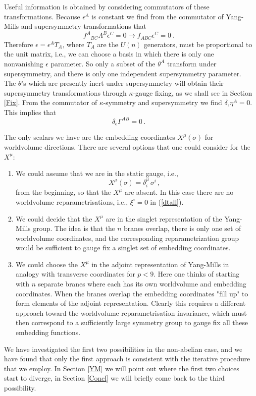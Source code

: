 \documentclass[12pt,a4paper]{article}
\begin{document}
Useful information is obtained by considering commutators of
these transformations.
Because $\epsilon^A$ is constant we find from the commutator of
Yang-Mills and supersymmetry transformations that
\begin{equation}
      f^{A}{}_{BC}\Lambda^B\epsilon^C=0\to f_{ABC}\epsilon^C=0\,.
\end{equation}
Therefore $\epsilon = \epsilon^A T_A$, where $T_A$ are the
$U(n)$ generators, must be proportional to the unit
matrix, i.e., we can choose a basis in which there is only
one nonvanishing $\epsilon$ parameter.
So only a subset of the $\theta^A$ transform under supersymmetry,
and there is only one independent supersymmetry parameter.
The $\theta$'s which are presently
inert under supersymmetry will obtain their supersymmetry
transformations through $\kappa$-gauge fixing, as we shall see
in Section \ref{Fix}. {From} the commutator of $\kappa$-symmetry and
supersymmetry we find $\delta_\epsilon \eta^A = 0$. This implies that
\begin{equation}
  \delta_\epsilon \Gamma^{AB} = 0\,.
\end{equation}

The only scalars we have are  the embedding coordinates
$X^\mu(\sigma)$ for worldvolume directions.
There are several options that one could consider for the $X^\mu$:
\begin{enumerate}
\item We could assume that we are in the static gauge, i.e.,
\begin{equation}
    X^\mu(\sigma) = \delta^\mu_i\,\sigma^i\,,
\end{equation}
 from the
 beginning, so that the $X^\mu$ are absent. In this case there are no
 worldvolume reparametrisations, i.e., $\xi^i=0$ in (\ref{dtall}).
\item We could decide that the $X^\mu$ are in the singlet representation
 of the Yang-Mills group. The idea is that the $n$ branes overlap,
 there is only one set of worldvolume coordinates, and the corresponding
 reparametrization group would be sufficient to gauge fix a singlet
 set of embedding coordinates.
\item We could choose the $X^\mu$ in the adjoint representation of
 Yang-Mills in analogy with transverse coordinates for $p<9$.
 Here one thinks of starting with $n$ separate branes where each has its
 own worldvolume and embedding coordinates. When the branes overlap
 the embedding coordinates "fill up" to form elements of the adjoint
 representation.
 Clearly
 this requires a different approach toward the worldvolume
 reparametrisation invariance, which must then correspond to a sufficiently
 large symmetry group to gauge fix all these embedding functions.
\end{enumerate}
We have investigated the first two possibilities in the non-abelian case,
and we have found that only the first approach is consistent with the
iterative procedure that we employ. In Section \ref{YM} we will point out
where the first two choices start to diverge, in Section \ref{Concl}
we will briefly come back to the third possibility.
\end{document}
